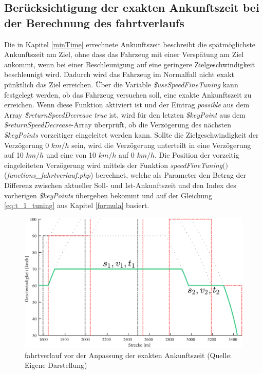 \subsection{Berücksichtigung der exakten Ankunftszeit bei der Berechnung des \Gls{fahrtverlauf}s} \label{time2}
Die in Kapitel \ref{minTime} errechnete Ankunftszeit beschreibt die spätmöglichste Ankunftszeit am Ziel, ohne dass das Fahrzeug mit einer Verspätung am Ziel ankommt, wenn bei einer Beschleunigung auf eine geringere Zielgeschwindigkeit beschleunigt wird. Dadurch wird das Fahrzeug im Normalfall nicht exakt pünktlich das Ziel erreichen. Über die Variable \textit{\$useSpeedFineTuning} kann festgelegt werden, ob das Fahrzeug versuchen soll, eine exakte Ankunftszeit zu erreichen. Wenn diese Funktion aktiviert ist und der Eintrag \textit{possible} aus dem Array \textit{\$returnSpeedDecrease} \textit{true} ist, wird für den letzten \textit{\$keyPoint} aus dem \textit{\$return\-Speed\-De\-crease}-Array überprüft, ob die Verzögerung des nächsten \textit{\$keyPoints} vorzeitiger eingeleitet werden kann. Sollte die Zielgeschwindigkeit der Verzögerung 0 $km/h$ sein, wird die Verzögerung unterteilt in eine Verzögerung auf 10 $km/h$ und eine von 10 $km/h$ auf 0 $km/h$. Die Position der vorzeitig eingeleiteten Verzögerung wird mittels der Funktion \textit{speedFineTuning$($$)$} (\textit{functions\_fahrtverlauf.php}) berechnet, welche als Parameter den Betrag der Differenz zwischen aktueller Soll- und Ist-Ankunftszeit und den Index des vorherigen \textit{\$keyPoints} übergeben bekommt und auf der Gleichung \ref{eq:t_1_tuning} aus Kapitel \ref{formula} basiert.
\begin{figure}
\includegraphics[width=\linewidth]{../images/matlab/it11.pdf}
\caption[\Gls{fahrtverlauf} vor der Anpassung der exakten Ankunftszeit]{\Gls{fahrtverlauf} vor der Anpassung der exakten Ankunftszeit (Quelle: Eigene Darstellung)}
\label{fig:it11}
\end{figure}

